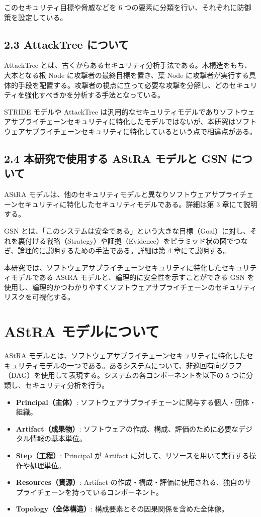 \documentclass[paper]{ieicej} %
\begin{document}
このセキュリティ目標や脅威などを 6 つの要素に分類を行い、それぞれに防御策を設定している。

\subsection{2.3 AttackTree について}
AttackTree とは、古くからあるセキュリティ分析手法である。木構造をもち、大本となる根 Node に攻撃者の最終目標を置き、葉 Node に攻撃者が実行する具体的手段を配置する。攻撃者の視点に立って必要な攻撃を分解し、どのセキュリティを強化すべきかを分析する手法となっている。

STRIDE モデルや AttackTree は汎用的なセキュリティモデルでありソフトウェアサプライチェーンセキュリティに特化したモデルではないが、本研究はソフトウェアサプライチェーンセキュリティに特化しているという点で相違点がある。

\subsection{2.4 本研究で使用する AStRA モデルと GSN について}
AStRA モデルは、他のセキュリティモデルと異なりソフトウェアサプライチェーンセキュリティに特化したセキュリティモデルである。詳細は第 3 章にて説明する。

GSN とは、「このシステムは安全である」という大きな目標（Goal）に対し、それを裏付ける戦略（Strategy）や証拠（Evidence）をピラミッド状の図でつなぎ、論理的に説明するための手法である。詳細は第 4 章にて説明する。

本研究では、ソフトウェアサプライチェーンセキュリティに特化したセキュリティモデルである AStRA モデルと、論理的に安全性を示すことができる GSN を使用し、論理的かつわかりやすくソフトウェアサプライチェーンのセキュリティリスクを可視化する。

\section{AStRA モデルについて}
AStRA モデルとは、ソフトウェアサプライチェーンセキュリティに特化したセキュリティモデルの一つである。あるシステムについて、非巡回有向グラフ（DAG）を使用して表現する。システムの各コンポーネントを以下の 5 つに分類し、セキュリティ分析を行う。

\begin{itemize}
    \item \textbf{Principal（主体）}: ソフトウェアサプライチェーンに関与する個人・団体・組織。
    \item \textbf{Artifact（成果物）}: ソフトウェアの作成、構成、評価のために必要なデジタル情報の基本単位。
    \item \textbf{Step（工程）}: Principal が Artifact に対して、リソースを用いて実行する操作や処理単位。
    \item \textbf{Resources（資源）}: Artifact の作成・構成・評価に使用される、独自のサプライチェーンを持っているコンポーネント。
    \item \textbf{Topology（全体構造）}: 構成要素とその因果関係を含めた全体像。
\end{itemize}
\end{document}
